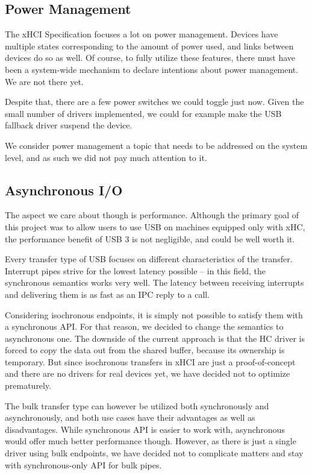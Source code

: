 \subsection{Power Management}

The xHCI Specification focuses a lot on power management. Devices have multiple
states corresponding to the amount of power used, and links between devices
do so as well. Of course, to fully utilize these features, there must have been
a system-wide mechanism to declare intentions about power management. We are not
there yet.

Despite that, there are a few power switches we could toggle just now. Given the
small number of drivers implemented, we could for example make the USB fallback
driver suspend the device.

We consider power management a topic that needs to be addressed on the
system level, and as such we did not pay much attention to it.

\subsection{Asynchronous I/O}

The aspect we care about though is performance. Although the primary goal of
this project was to allow users to use USB on machines equipped only with xHC,
the performance benefit of USB 3 is not negligible, and could be well worth it.

Every transfer type of USB focuses on different characteristics of the
transfer. Interrupt pipes strive for the lowest latency possible -- in this
field, the synchronous semantics works very well. The latency between receiving
interrupts and delivering them is as fast as an IPC reply to a call.

Considering isochronous endpoints, it is simply not possible to satisfy them
with a synchronous API. For that reason, we decided to change the semantics to asynchronous
one. The downside of the current approach is that the HC driver is forced to
copy the data out from the shared buffer, because its ownership is temporary.
But since isochronous transfers in xHCI are just a proof-of-concept and
there are no drivers for real devices yet, we have decided not to optimize
prematurely.

The bulk transfer type can however be utilized both synchronously and
asynchronously, and both use cases have their advantages as well as disadvantages. While synchronous API is easier to
work with, asynchronous would offer much better performance though. However, as there is just
a single driver using bulk endpoints, we have decided not to complicate matters and stay
with synchronous-only API for bulk pipes.

